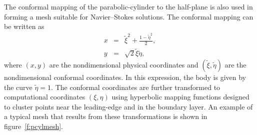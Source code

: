 The conformal mapping of the parabolic-cylinder to the half-plane is also used
in forming a mesh suitable for Navier--Stokes solutions.  The conformal mapping
can be written as
%
\begin{eqnarray}
  x &=& \tilde\xi^2 + \frac{1 - \tilde\eta^2}{2} \comma \\
  y &=& \sqrt{2} \tilde\xi \tilde\eta \comma
\end{eqnarray}
%
%
%
where $(x,y)$ are the nondimensional physical coordinates and $(\tilde\xi,
\tilde\eta)$ are the nondimensional conformal coordinates.  In this
expression, the body is given by the curve $\tilde\eta=1$.  The conformal
coordinates are further transformed to computational coordinates $(\xi,\eta)$
using hyperbolic mapping functions \cite{MaMoLe:96} designed to cluster points
near the leading-edge and in the boundary layer.  An example of a typical mesh
that results from these transformations is shown in figure~\ref{f:pcylmesh}.

